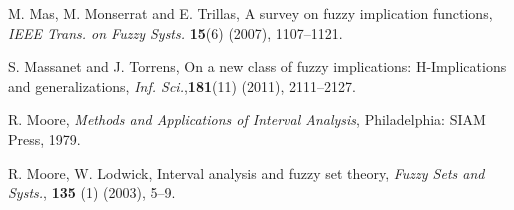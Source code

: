 \documentclass[12pt]{article}
\theoremstyle{plain}
\theoremstyle{remark}
\theoremstyle{definition}
\theoremstyle{proposition}
\begin{document}
\begin{thebibliography}{8}
{%

%

M. Mas, M. Monserrat and E. Trillas, A survey on fuzzy implication functions,
\emph{IEEE Trans. on Fuzzy Systs.} \textbf{15}(6) (2007), 1107--1121.

 S. Massanet and J. Torrens, On a new class of fuzzy implications: H-Implications
		 and generalizations, \emph{Inf. Sci.},\hspace{-0.1cm}\textbf{181}(11) \hspace{-0.05cm}(2011),\hspace{-0.05cm} 2111--2127.



%




R. Moore, \emph{Methods and Applications of Interval Analysis}, Philadelphia: SIAM Press, 1979.

R. Moore, W. Lodwick, Interval analysis and fuzzy set theory, {\em
Fuzzy Sets and Systs.}, {\bf 135} (1) (2003),
5--9.

%

}
\end{thebibliography}
\end{document}
